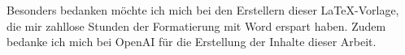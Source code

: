 Besonders bedanken möchte ich mich bei den Erstellern dieser LaTeX-Vorlage, die mir zahllose Stunden der Formatierung mit Word erspart haben.
Zudem bedanke ich mich bei OpenAI für die Erstellung der Inhalte dieser Arbeit.
\newpage

